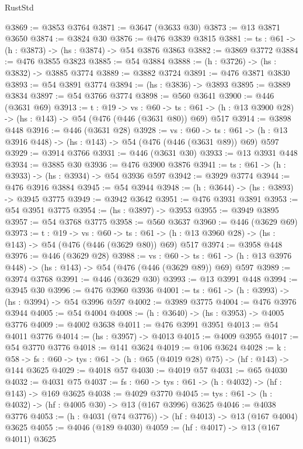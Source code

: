 \begin{lexlean}{RustStd}
\begin{coremodule}
@3869 := @3853 @3764
@3871 := @3647 (@3633 @30)
@3873 := @13 @3871 @3650
@3874 := @3824 @30
@3876 := @476 @3839 @3815
@3881 := {ts : @61} -> (h : @3873) -> (hs : @3874) -> @54 @3876 @3863
@3882 := @3869 @3772
@3884 := @476 @3855 @3823
@3885 := @54 @3884
@3888 := (h : @3726) -> (hs : @3832) -> @3885 @3774
@3889 := @3882 @3724
@3891 := @476 @3871 @3830
@3893 := @54 @3891 @3774
@3894 := (hs : @3836) -> @3893
@3895 := @3889 @3834
@3897 := @54 @3766 @3774
@3898 := @560 @3641
@3900 := @446 (@3631 @69)
@3913 := {t : @19} ->
  {vs : @60} ->
  {ts : @61} -> (h : @13 @3900 @28) -> (hs : @143) -> @54 (@476 (@446 (@3631 @80)) @69) @517
@3914 := @3898 @448
@3916 := @446 (@3631 @28)
@3928 := {vs : @60} ->
  {ts : @61} -> (h : @13 @3916 @448) -> (hs : @143) -> @54 (@476 (@446 (@3631 @89)) @69) @597
@3929 := @3914 @3766
@3931 := @446 (@3631 @30)
@3933 := @13 @3931 @448
@3934 := @3885 @30
@3936 := @476 @3900 @3876
@3941 := {ts : @61} -> (h : @3933) -> (hs : @3934) -> @54 @3936 @597
@3942 := @3929 @3774
@3944 := @476 @3916 @3884
@3945 := @54 @3944
@3948 := (h : @3644) -> (hs : @3893) -> @3945 @3775
@3949 := @3942 @3642
@3951 := @476 @3931 @3891
@3953 := @54 @3951 @3775
@3954 := (hs : @3897) -> @3953
@3955 := @3949 @3895
@3957 := @54 @3768 @3775
@3958 := @560 @3637
@3960 := @446 (@3629 @69)
@3973 := {t : @19} ->
  {vs : @60} ->
  {ts : @61} -> (h : @13 @3960 @28) -> (hs : @143) -> @54 (@476 (@446 (@3629 @80)) @69) @517
@3974 := @3958 @448
@3976 := @446 (@3629 @28)
@3988 := {vs : @60} ->
  {ts : @61} -> (h : @13 @3976 @448) -> (hs : @143) -> @54 (@476 (@446 (@3629 @89)) @69) @597
@3989 := @3974 @3768
@3991 := @446 (@3629 @30)
@3993 := @13 @3991 @448
@3994 := @3945 @30
@3996 := @476 @3960 @3936
@4001 := {ts : @61} -> (h : @3993) -> (hs : @3994) -> @54 @3996 @597
@4002 := @3989 @3775
@4004 := @476 @3976 @3944
@4005 := @54 @4004
@4008 := (h : @3640) -> (hs : @3953) -> @4005 @3776
@4009 := @4002 @3638
@4011 := @476 @3991 @3951
@4013 := @54 @4011 @3776
@4014 := (hs : @3957) -> @4013
@4015 := @4009 @3955
@4017 := @54 @3770 @3776
@4018 := @141 @3624
@4019 := @106 @3624
@4028 := {k : @58} ->
  {fs : @60} -> {tys : @61} -> (h : @65 (@4019 @28) @75) -> (hf : @143) -> @144 @3625
@4029 := @4018 @57
@4030 := @4019 @57
@4031 := @65 @4030
@4032 := @4031 @75
@4037 := {fs : @60} -> {tys : @61} -> (h : @4032) -> (hf : @143) -> @169 @3625
@4038 := @4029 @3770
@4045 := {tys : @61} -> (h : @4032) -> (hf : @4005 @30) -> @13 (@167 @3996) @3625
@4046 := @4038 @3776
@4053 := (h : @4031 (@74 @3776)) -> (hf : @4013) -> @13 (@167 @4004) @3625
@4055 := @4046 (@189 @4030)
@4059 := (hf : @4017) -> @13 (@167 @4011) @3625

\end{coremodule}
\end{lexlean}
